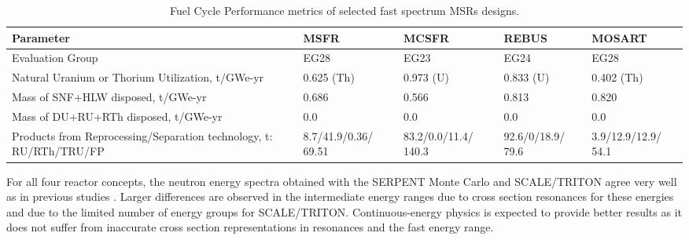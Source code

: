\documentclass{anstrans}
\begin{document}
\begin{table}[h!]
  \centering
  \caption{Fuel Cycle Performance metrics of selected fast spectrum \glspl{MSR} designs.}
  \label{table:metrics} 
  \begin{tabular}{p{} p{} p{} p{} p{}} \toprule 
   Parameter &  \gls{MSFR} & \gls{MCSFR} & REBUS & \gls{MOSART} \\ \midrule
   Evaluation Group	&  EG28 & EG23 & EG24 & EG28   \\ 
   Natural Uranium or Thorium Utilization, t/GWe-yr & 0.625 (Th) & 0.973 (U) & 0.833 (U) & 0.402 (Th) \\
   Mass of \gls{SNF}+\gls{HLW} disposed, t/GWe-yr & 0.686 & 0.566 & 0.813 &  0.820 \\
   Mass of DU+RU+RTh disposed, t/GWe-yr & 0.0 & 0.0 & 0.0 &  0.0 \\
   Products from Reprocessing/Separation technology, t: \gls{RU}/\gls{RTh}/\gls{TRU}/\gls{FP} &
   8.7/41.9/0.36/ 69.51 &  83.2/0.0/11.4/ 140.3 & 92.6/0/18.9/ 79.6 & 3.9/12.9/12.9/ 54.1  \\
 \bottomrule 
  \end{tabular}
  \vspace{-0.2in}
\end{table}

For all four reactor concepts, the neutron energy spectra obtained with the SERPENT Monte Carlo and SCALE/TRITON agree very well as in previous studies \cite{betzler_fuel_2018}. Larger differences are observed in the intermediate energy ranges due to cross section resonances for these energies and due to the limited number of energy groups for SCALE/TRITON. Continuous-energy physics is expected to provide better results as it does not suffer from inaccurate cross section representations in resonances and the fast energy range.
\end{document}
